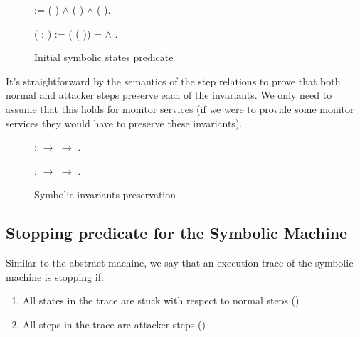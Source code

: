 \begin{figure}[ht]
    
  :=\coqdoceol \coqdocindent{1.00em} 
  ( )
  \ensuremath{\land}\coqdoceol \coqdocindent{1.00em}
   (
  ) \ensuremath{\land}\coqdoceol \coqdocindent{1.00em}
   (
  ).\coqdoceol \coqdocemptyline \coqdocnoindent

    ( :
   ) :=\coqdoceol
  \coqdocindent{1.00em} (
  ( )) = 
  \ensuremath{\land}\coqdoceol \coqdocindent{1.00em}
   .\coqdoceol
\caption{Initial symbolic states predicate}
\end{figure}

It's straightforward by the semantics of the step relations to prove
that both normal and attacker steps preserve each of the invariants.
We only need to assume that this holds for monitor services (\IE if we
were to provide some monitor services they would have to preserve
these invariants).

\begin{figure}[ht]
   
    :\coqdoceol \coqdocindent{1.00em}
   
  \ensuremath{\rightarrow}\coqdoceol \coqdocindent{1.00em}
   
   \ensuremath{\rightarrow}\coqdoceol
  \coqdocindent{1.00em} 
  .\coqdoceol

  \coqdocemptyline \coqdocnoindent {}
   
   :\coqdoceol \coqdocindent{1.00em}
   
  \ensuremath{\rightarrow}\coqdoceol \coqdocindent{1.00em}
    
  \ensuremath{\rightarrow}\coqdoceol \coqdocindent{1.00em}
   .\coqdoceol
\caption{Symbolic invariants preservation}
\end{figure}

\subsection{Stopping predicate for the Symbolic Machine}
\label{sec:symbolic_stopping}

Similar to the abstract machine, we say that an execution trace of the
symbolic machine is stopping if:
\begin{enumerate}
\item All states in the trace are stuck with respect to normal steps
  (\stepn{}{})
\item All steps in the trace are attacker steps (\stepa{}{}{})
\end{enumerate}